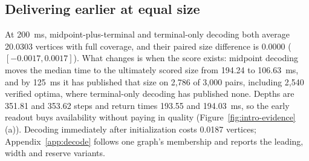\subsection{Delivering earlier at equal size}
At 200~ms, midpoint-plus-terminal and terminal-only decoding both average 20.0303 vertices with full coverage, and their paired size difference is 0.0000 ($[-0.0017,0.0017]$). What changes is when the score exists: midpoint decoding moves the median time to the ultimately scored size from 194.24 to 106.63~ms, and by 125~ms it has published that size on 2,786 of 3,000 pairs, including 2,540 verified optima, where terminal-only decoding has published none. Depths are 351.81 and 353.62 steps and return times 193.55 and 194.03~ms, so the early readout buys availability without paying in quality (Figure~\ref{fig:intro-evidence}(a)). Decoding immediately after initialization costs 0.0187 vertices; Appendix~\ref{app:decode} follows one graph's membership and reports the leading, width and reserve variants.
